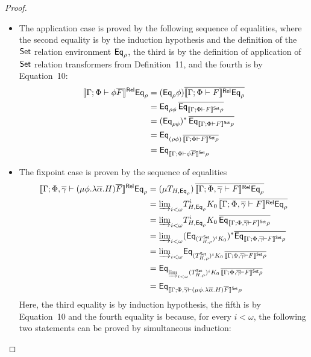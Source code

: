\documentclass[acmsmall,review,anonymous]{acmart}
\theoremstyle{definition}
\begin{document}
\begin{proof}
\begin{itemize}
\item The application case is proved by the following sequence of
  equalities, where the second equality is by the induction hypothesis
  and the definition of the ${\mathsf{Set}}$ relation environment $\mathsf{Eq}_\rho$,
  the third is by the definition of application of ${\mathsf{Set}}$ relation
  transformers from Definition~11, and the fourth is by
  Equation~10:
\[
\begin{split}
\llbracket{\Gamma; \Phi \vdash \phi\overline{F}}\rrbracket^{\mathsf{Rel}}\mathsf{Eq}_{\rho} &=
(\mathsf{Eq}_{\rho}\phi)\overline{\llbracket{\Gamma; \Phi \vdash F}\rrbracket^{\mathsf{Rel}}
\mathsf{Eq}_{\rho}}\\
&= \mathsf{Eq}_{\rho \phi}\, \overline{\mathsf{Eq}_{\llbracket{\Gamma; \Phi \vdash F}\rrbracket^{\mathsf{Set}}
  \rho}}\\
&= (\mathsf{Eq}_{\rho \phi})^* \,\overline{\mathsf{Eq}_{\llbracket{\Gamma; \Phi \vdash F}\rrbracket^{\mathsf{Set}}
  \rho}}\\
&= \mathsf{Eq}_{(\rho \phi) \,\overline{\llbracket{\Gamma; \Phi \vdash F}\rrbracket^{\mathsf{Set}} \rho}}\\
&= \mathsf{Eq}_{\llbracket{\Gamma; \Phi \vdash \phi\overline{F}}\rrbracket^{\mathsf{Set}}\rho}
\end{split}
\]
\item 
  The fixpoint case is proven by the sequence of equalities
\[
\begin{split}
\llbracket{\Gamma; \Phi, \overline{\gamma} \vdash (\mu \phi.\lambda
  \overline{\alpha}. H)\overline{F}}\rrbracket^{\mathsf{Rel}}\mathsf{Eq}_{\rho} 
&=(\mu {T_{H, \mathsf{Eq}_{\rho}}}) \,\overline{\llbracket{\Gamma; \Phi, \overline{\gamma}
    \vdash F}\rrbracket^{\mathsf{Rel}}\mathsf{Eq}_{\rho}}\\   
&= {{\underrightarrow{\lim}}_{i < \omega}{T^i_{H, \mathsf{Eq}_{\rho}} K_0}}\, \overline{\llbracket{\Gamma;
    \Phi, \overline{\gamma} \vdash F}\rrbracket^{\mathsf{Rel}}\mathsf{Eq}_{\rho}}\\
&= {{\underrightarrow{\lim}}_{i < \omega}{ T^i_{H, \mathsf{Eq}_{\rho}} K_0 \,\overline{\mathsf{Eq}_{\llbracket{\Gamma;
    \Phi, \overline{\gamma}  \vdash F}\rrbracket^{\mathsf{Set}}\rho}}}}\\
&= {{\underrightarrow{\lim}}_{i < \omega}{(\mathsf{Eq}_{(T^{\mathsf{Set}}_{H,\rho})^i K_0})^*
  \overline{\mathsf{Eq}_{\llbracket{\Gamma; \Phi, \overline{\gamma}  \vdash F}\rrbracket^{\mathsf{Set}}\rho}}}}\\
&= {{\underrightarrow{\lim}}_{i < \omega}{\mathsf{Eq}_{(T^{\mathsf{Set}}_{H,\rho})^i K_0 \,\overline{\llbracket{\Gamma;
        \Phi, \overline{\gamma}  \vdash F}\rrbracket^{\mathsf{Set}}\rho}}}}\\ 
&= \mathsf{Eq}_{{{\underrightarrow{\lim}}_{i < \omega}{ (T^{\mathsf{Set}}_{H,\rho})^i K_0\,
    \overline{\llbracket{\Gamma; \Phi, \overline{\gamma}  \vdash F}\rrbracket^{\mathsf{Set}}\rho}}}}\\
&= \mathsf{Eq}_{\llbracket{\Gamma; \Phi, \overline{\gamma}  \vdash (\mu \phi.\lambda
      \overline{\alpha}. H)\overline{F}}\rrbracket^{\mathsf{Set}}\rho}
\end{split}
\]
Here, the third equality is by induction hypothesis, the fifth is by
Equation~10 and the fourth equality is because, for every $i < \omega$,
the following two statements can be proved by simultaneous induction:

\end{itemize}
\end{proof}
\end{document}
